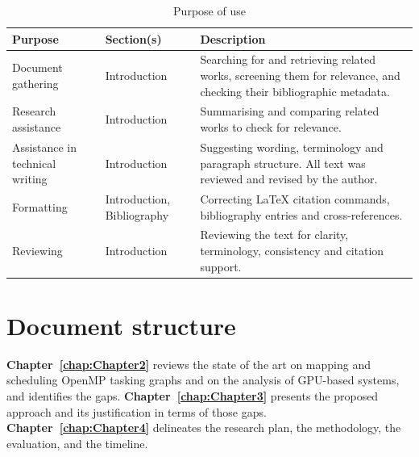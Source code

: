 \begin{table}[htbp]
  \centering
  \caption{Purpose of use}
  \label{tab:ai-purpose}
  \begin{tabularx}{\textwidth}{l l X}
    \toprule
    Purpose                         & Section(s)                  & Description \\
    \midrule
    Document gathering              & Introduction                &
    Searching for and retrieving related works, screening them for relevance, and checking their bibliographic metadata. \\

    Research assistance             & Introduction                &
    Summarising and comparing related works to check for relevance.\\

    Assistance in technical writing & Introduction                &
    Suggesting wording, terminology and paragraph structure. All text was reviewed and revised by the author. \\

    Formatting                      & Introduction, Bibliography  &
    Correcting LaTeX citation commands, bibliography entries and cross-references. \\

    Reviewing                       & Introduction                &
    Reviewing the text for clarity, terminology, consistency and citation support. \\
    \bottomrule
  \end{tabularx}
\end{table}


\section{Document structure}
\label{sec:chap1_structure}

\textbf{Chapter~\ref{chap:Chapter2}} reviews the state of the art on mapping and scheduling OpenMP tasking graphs and on the analysis of GPU-based systems, and identifies the gaps. 
\textbf{Chapter~\ref{chap:Chapter3}} presents the proposed approach and its justification in terms of those gaps. \textbf{Chapter~\ref{chap:Chapter4}} delineates the research plan, the methodology, the evaluation, and the timeline.




